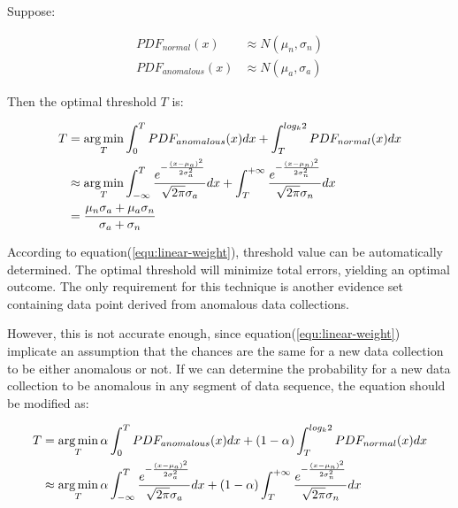 \documentclass[a4paper]{IEEEtran}
\begin{document}
			Suppose:
			
			\begin{align}
				PDF_{normal}(x) &\approx N(\mu_n, \sigma_n)\\
				PDF_{anomalous}(x) &\approx N(\mu_a, \sigma_a)
			\end{align}
			
			Then the optimal threshold $T$ is:
			
			\begin{equation}\label{equ:linear-weight}
				\small
				\begin{split}
					T &= \mathop{\arg\min}_{T} \int_{0}^{T}PDF_{anomalous}(x)dx +
					 \int_{T}^{log_k2}PDF_{normal}(x)dx\\
					& \approx \mathop{\arg\min}_{T}
					\int_{-\infty}^{T}
					\frac{e^{-\frac{(x - \mu_a)^2}{2\sigma_a^2}}}{\sqrt{2\pi} \sigma_a}dx
					+ \int_{T}^{+\infty}
					\frac{e^{-\frac{(x - \mu_n)^2}{2\sigma_n^2}}}{\sqrt{2\pi} \sigma_n}dx\\
					& = \frac{\mu_n\sigma_a + \mu_a\sigma_n}{\sigma_a + \sigma_n}
				\end{split}
			\end{equation}
			
			According to equation(\ref{equ:linear-weight}), threshold value can be automatically determined. The optimal threshold will minimize total errors, yielding an optimal outcome. The only requirement for this technique is another evidence set containing data point derived from anomalous data collections.
			
			However, this is not accurate enough, since equation(\ref{equ:linear-weight}) implicate an assumption that the chances are the same for a new data collection to be either anomalous or not. If we can determine the probability for a new data collection to be anomalous in any segment of data sequence, the equation should be modified as:
			
			\begin{equation}\label{equ:linear-balanced}
				\small
				\begin{split}
					T & = \mathop{\arg\min}_{T} \alpha\int_{0}^{T}PDF_{anomalous}(x)dx +
				(1-\alpha)\int_{T}^{log_k2}PDF_{normal}(x)dx\\
					& \approx \mathop{\arg\min}_{T}
					\alpha\int_{-\infty}^{T}
					\frac{e^{-\frac{(x - \mu_a)^2}{2\sigma_a^2}}}{\sqrt{2\pi} \sigma_a}dx
					+ (1-\alpha)\int_{T}^{+\infty}
					\frac{e^{-\frac{(x - \mu_n)^2}{2\sigma_n^2}}}{\sqrt{2\pi} \sigma_n}dx
				\end{split}
			\end{equation}
			
\end{document}
